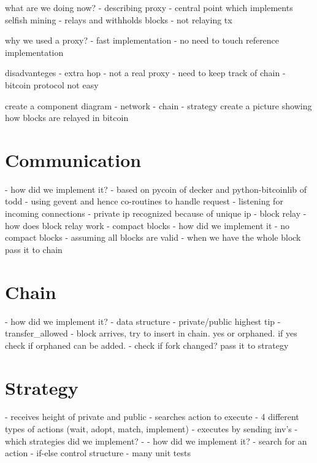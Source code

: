 what are we doing now?
 - describing proxy 
 - central point which implements selfish mining
 - relays and withholds blocks
 - not relaying tx

why we used a proxy?
 - fast implementation
 - no need to touch reference implementation

disadvanteges
 - extra hop
 - not a real proxy
   - need to keep track of chain
   - bitcoin protocol not easy

create a component diagram
 - network
 - chain
 - strategy
create a picture showing how blocks are relayed in bitcoin
 
\section{Communication}
 - how did we implement it?
   - based on pycoin of decker and python-bitcoinlib of todd
   - using gevent and hence co-routines to handle request
   - listening for incoming connections
   - private ip recognized because of unique ip
 - block relay
   - how does block relay work
   - compact blocks
   - how did we implement it
     - no compact blocks
     - assuming all blocks are valid
     - when we have the whole block pass it to chain

\section{Chain}
 - how did we implement it?
   - data structure
   - private/public highest tip
   - transfer\_allowed
   - block arrives, try to insert in chain. yes or orphaned. if yes check if orphaned can be added.
   - check if fork changed? pass it to strategy

\section{Strategy}
 - receives height of private and public
 - searches action to execute
   - 4 different types of actions (wait, adopt, match, implement)
 - executes by sending inv's
 - which strategies did we implement?
 - 
 - how did we implement it?
   - search for an action
   - if-else control structure
   - many unit tests
   
